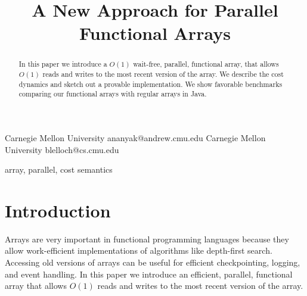 \documentclass[preprint]{sigplanconf}
\begin{document}
\setlength{\pdfpageheight}{\paperheight}
\setlength{\pdfpagewidth}{\paperwidth}




\title{A New Approach for Parallel Functional Arrays}

           {Carnegie Mellon University}
           {ananyak@andrew.cmu.edu}
           {Carnegie Mellon University}
           {blelloch@cs.cmu.edu}

\maketitle

\newtheorem{theorem}{Theorem}[section]
\newtheorem{corollary}{Corollary}[theorem]
\newtheorem{lemma}[theorem]{Lemma}
\theoremstyle{definition}
\newtheorem{definition}{Definition}[section]

\begin{abstract}
In this paper we introduce a $O(1)$ wait-free, parallel, functional array, that allows $O(1)$ reads and writes to the most recent version of the array. We describe the cost dynamics and sketch out a provable implementation. We show favorable benchmarks comparing our functional arrays with regular arrays in Java.
\end{abstract}


\keywords
array, parallel, cost semantics

\section{Introduction}

Arrays are very important in functional programming languages because they allow work-efficient implementations of algorithms like depth-first search. Accessing old versions of arrays can be useful for efficient checkpointing, logging, and event handling. In this paper we introduce an efficient, parallel, functional array that allows $O(1)$ reads and writes to the most recent version of the array.
\end{document}
